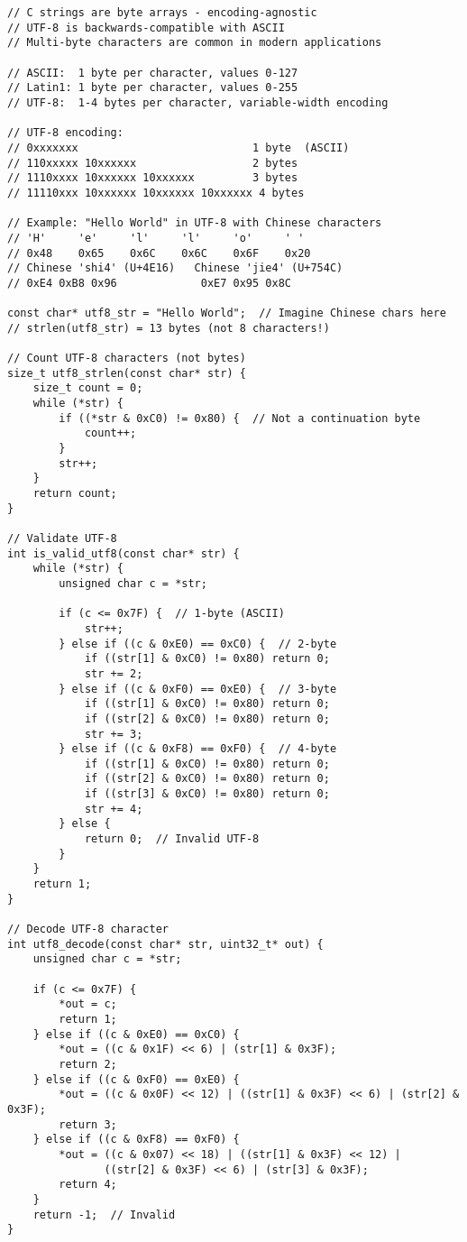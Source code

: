 \begin{lstlisting}
// C strings are byte arrays - encoding-agnostic
// UTF-8 is backwards-compatible with ASCII
// Multi-byte characters are common in modern applications

// ASCII:  1 byte per character, values 0-127
// Latin1: 1 byte per character, values 0-255
// UTF-8:  1-4 bytes per character, variable-width encoding

// UTF-8 encoding:
// 0xxxxxxx                           1 byte  (ASCII)
// 110xxxxx 10xxxxxx                  2 bytes
// 1110xxxx 10xxxxxx 10xxxxxx         3 bytes
// 11110xxx 10xxxxxx 10xxxxxx 10xxxxxx 4 bytes

// Example: "Hello World" in UTF-8 with Chinese characters
// 'H'     'e'     'l'     'l'     'o'     ' '
// 0x48    0x65    0x6C    0x6C    0x6F    0x20
// Chinese 'shi4' (U+4E16)   Chinese 'jie4' (U+754C)
// 0xE4 0xB8 0x96             0xE7 0x95 0x8C

const char* utf8_str = "Hello World";  // Imagine Chinese chars here
// strlen(utf8_str) = 13 bytes (not 8 characters!)

// Count UTF-8 characters (not bytes)
size_t utf8_strlen(const char* str) {
    size_t count = 0;
    while (*str) {
        if ((*str & 0xC0) != 0x80) {  // Not a continuation byte
            count++;
        }
        str++;
    }
    return count;
}

// Validate UTF-8
int is_valid_utf8(const char* str) {
    while (*str) {
        unsigned char c = *str;

        if (c <= 0x7F) {  // 1-byte (ASCII)
            str++;
        } else if ((c & 0xE0) == 0xC0) {  // 2-byte
            if ((str[1] & 0xC0) != 0x80) return 0;
            str += 2;
        } else if ((c & 0xF0) == 0xE0) {  // 3-byte
            if ((str[1] & 0xC0) != 0x80) return 0;
            if ((str[2] & 0xC0) != 0x80) return 0;
            str += 3;
        } else if ((c & 0xF8) == 0xF0) {  // 4-byte
            if ((str[1] & 0xC0) != 0x80) return 0;
            if ((str[2] & 0xC0) != 0x80) return 0;
            if ((str[3] & 0xC0) != 0x80) return 0;
            str += 4;
        } else {
            return 0;  // Invalid UTF-8
        }
    }
    return 1;
}

// Decode UTF-8 character
int utf8_decode(const char* str, uint32_t* out) {
    unsigned char c = *str;

    if (c <= 0x7F) {
        *out = c;
        return 1;
    } else if ((c & 0xE0) == 0xC0) {
        *out = ((c & 0x1F) << 6) | (str[1] & 0x3F);
        return 2;
    } else if ((c & 0xF0) == 0xE0) {
        *out = ((c & 0x0F) << 12) | ((str[1] & 0x3F) << 6) | (str[2] & 0x3F);
        return 3;
    } else if ((c & 0xF8) == 0xF0) {
        *out = ((c & 0x07) << 18) | ((str[1] & 0x3F) << 12) |
               ((str[2] & 0x3F) << 6) | (str[3] & 0x3F);
        return 4;
    }
    return -1;  // Invalid
}


\end{lstlisting}
